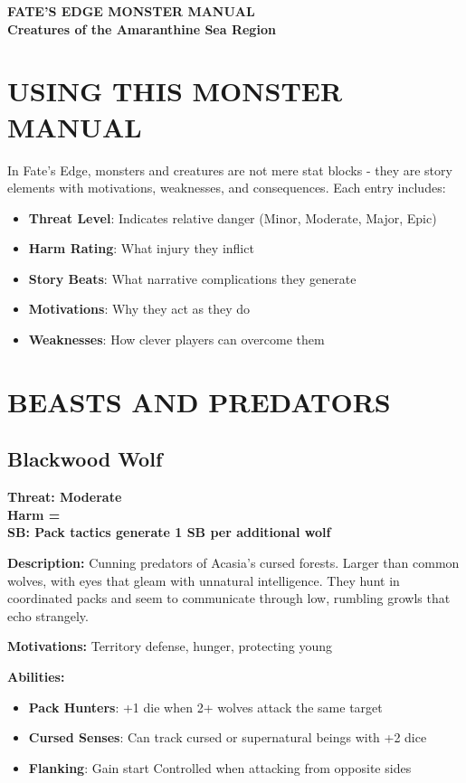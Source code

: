 \documentclass[12pt]{article}
\newcommand{\cp}[1]{\textbf{SB: #1}}
\newcommand{\harm}[1]{\textbf{Harm #1}}
\newcommand{\threat}[1]{\textbf{Threat: #1}}
\begin{document}
\begin{center}
{\LARGE \textbf{FATE'S EDGE MONSTER MANUAL}} \\
{\large \textbf{Creatures of the Amaranthine Sea Region}}
\end{center}

\section*{USING THIS MONSTER MANUAL}

In Fate's Edge, monsters and creatures are not mere stat blocks - they are story elements with motivations, weaknesses, and consequences. Each entry includes:
\begin{itemize}
\item \textbf{Threat Level}: Indicates relative danger (Minor, Moderate, Major, Epic)
\item \textbf{Harm Rating}: What injury they inflict
\item \textbf{Story Beats}: What narrative complications they generate
\item \textbf{Motivations}: Why they act as they do
\item \textbf{Weaknesses}: How clever players can overcome them
\end{itemize}

\section{BEASTS AND PREDATORS}

\subsection*{Blackwood Wolf}

\threat{Moderate} \\
\harm{=} \\
\cp{Pack tactics generate 1 SB per additional wolf}

\vspace{0.5em}
\textbf{Description:} Cunning predators of Acasia's cursed forests. Larger than common wolves, with eyes that gleam with unnatural intelligence. They hunt in coordinated packs and seem to communicate through low, rumbling growls that echo strangely.

\textbf{Motivations:} Territory defense, hunger, protecting young

\textbf{Abilities:}
\begin{itemize}
\item \textbf{Pack Hunters}: +1 die when 2+ wolves attack the same target
\item \textbf{Cursed Senses}: Can track cursed or supernatural beings with +2 dice
\item \textbf{Flanking}: Gain start Controlled when attacking from opposite sides
\end{itemize}
\end{document}
